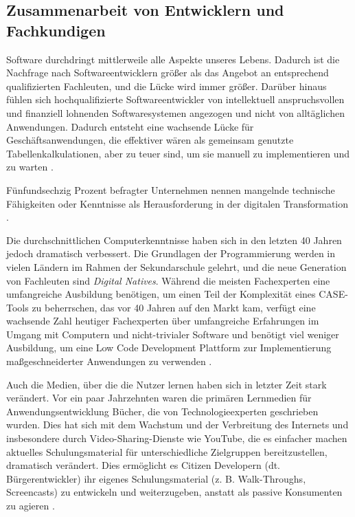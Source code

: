 \documentclass[12pt]{article} %
\begin{document}
	\subsection{Zusammenarbeit von Entwicklern und Fachkundigen} \label{Personalmangel}	
	Software durchdringt mittlerweile alle Aspekte unseres Lebens. Dadurch ist die Nachfrage nach Softwareentwicklern größer als das Angebot an entsprechend qualifizierten Fachleuten, und die Lücke wird immer größer. Darüber hinaus fühlen sich hochqualifizierte Softwareentwickler von intellektuell anspruchsvollen und finanziell lohnenden Softwaresystemen angezogen und nicht von alltäglichen Anwendungen. Dadurch entsteht eine wachsende Lücke für Geschäftsanwendungen, die effektiver wären als gemeinsam genutzte Tabellenkalkulationen, aber zu teuer sind, um sie manuell zu implementieren und zu warten \autocite{DiRuscio.2022}.

	Fünfundsechzig Prozent befragter Unternehmen nennen mangelnde technische Fähigkeiten oder Kenntnisse als Herausforderung in der digitalen Transformation \autocite{EmmaVanPelt.2019}. \newline %
	
	Die durchschnittlichen Computerkenntnisse haben sich in den letzten 40 Jahren jedoch dramatisch verbessert. Die Grundlagen der Programmierung werden in vielen Ländern im Rahmen der Sekundarschule gelehrt, und die neue Generation von Fachleuten sind \emph{Digital Natives}. Während die meisten Fachexperten eine umfangreiche Ausbildung benötigen, um einen Teil der Komplexität eines CASE-Tools zu beherrschen, das vor 40 Jahren auf den Markt kam, verfügt eine wachsende Zahl heutiger Fachexperten über umfangreiche Erfahrungen im Umgang mit Computern und nicht-trivialer Software und benötigt viel weniger Ausbildung, um eine Low Code Development Plattform zur Implementierung maßgeschneiderter Anwendungen zu verwenden \autocite{DiRuscio.2022}. \newline
	
	Auch die Medien, über die die Nutzer lernen haben sich in letzter Zeit stark verändert. Vor ein paar Jahrzehnten waren die primären Lernmedien für Anwendungsentwicklung Bücher, die von Technologieexperten geschrieben wurden. Dies hat sich mit dem Wachstum und der Verbreitung des Internets und insbesondere durch Video-Sharing-Dienste wie YouTube, die es einfacher machen aktuelles Schulungsmaterial für unterschiedliche Zielgruppen bereitzustellen, dramatisch verändert.
	Dies ermöglicht es Citizen Developern (dt. Bürgerentwickler) ihr eigenes Schulungsmaterial (z. B. Walk-Throughs, Screencasts) zu entwickeln und weiterzugeben, anstatt als passive Konsumenten zu agieren \autocite{DiRuscio.2022}.
	
\end{document}

